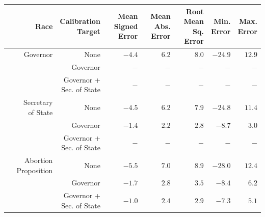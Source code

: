 
\begin{tabular}{rrrrrrr}
\toprule
Race & \makecell[r]{Calibration\\Target} & \makecell[r]{Mean\\Signed Error} & \makecell[r]{Mean\\Abs. Error} & \makecell[r]{Root Mean\\Sq. Error} & \makecell[r]{Min.\\Error} & \makecell[r]{Max.\\Error}\\
\midrule
Governor & None & $-4.4$ & $6.2$ & $8.0$ & $-24.9$ & $12.9$\\
 & Governor & $-$ & $-$ & $-$ & $-$ & $-$\\
 & \makecell[l]{Governor +\\Sec. of State} & $-$ & $-$ & $-$ & $-$ & \vphantom{1} $-$\\
\midrule
\addlinespace
\makecell[r]{Secretary\\of State} & None & $-4.5$ & $6.2$ & $7.9$ & $-24.8$ & $11.4$\\
 & Governor & $-1.4$ & $2.2$ & $2.8$ & $ -8.7$ & $ 3.0$\\
 & \makecell[l]{Governor +\\Sec. of State} & $-$ & $-$ & $-$ & $-$ & $-$\\
\midrule
\addlinespace
Abortion Proposition & None & $-5.5$ & $7.0$ & $8.9$ & $-28.0$ & $12.4$\\
 & Governor & $-1.7$ & $2.8$ & $3.5$ & $ -8.4$ & $ 6.2$\\
 & \makecell[l]{Governor +\\Sec. of State} & $-1.0$ & $2.4$ & $2.9$ & $ -7.3$ & $ 5.1$\\
\bottomrule
\end{tabular}